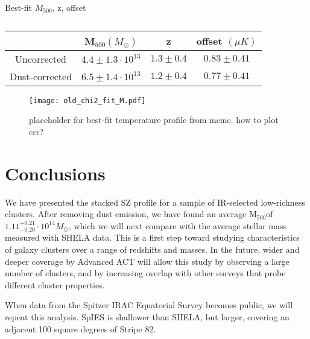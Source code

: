 \documentclass[twocolumn,iop]{emulateapj}
\begin{document}
\begin{table}
\label{table:mcmcfitparam}
\centering
\caption{Best-fit $M_{500}$, z, offset}
\begin{tabular}{| c || c | c | c |}
\hline
 & M$_{500} (M_{\odot})$ & z & offset $(\mu K)$\\ \hline
 Uncorrected &  $4.4 \pm 1.3 \cdot 10^{13}$ & $1.3 \pm 0.4$ & $0.83 \pm 0.41$ \\ \hline
 Dust-corrected & $6.5 \pm 1.4 \cdot 10^{13}$ & $1.2 \pm 0.4$ & $0.77 \pm 0.41$ \\ \hline
\end{tabular}
\caption*{}
\end{table}


\begin{figure}
\centering
\texttt{[image: old\_chi2\_fit\_M.pdf]}
\caption{placeholder for best-fit temperature profile from mcmc. how to plot err?}
\end{figure}


\section{Conclusions}
We have presented the stacked SZ profile for a sample of IR-selected low-richness clusters. After removing dust emission, we have found an average M$_{500}$of  $1.11^{+0.21}_{-0.20} \cdot 10^{14} M_{\odot}$, which we will next compare with the average stellar mass measured with SHELA data. This is a first step toward studying characteristics of galaxy clusters over a range of redshifts and masses. In the future, wider and deeper coverage by Advanced ACT will allow this study by observing a large number of clusters, and by increasing overlap with other surveys that probe different cluster properties.

When data from the Spitzer IRAC Equatorial Survey \citep[SpIES,][]{2015AAS...22533618T} becomes public, we will repeat this analysis.  SpIES is shallower than SHELA, but larger, covering an adjacent 100 square degrees of Stripe 82.
 

   
 
\end{document}
